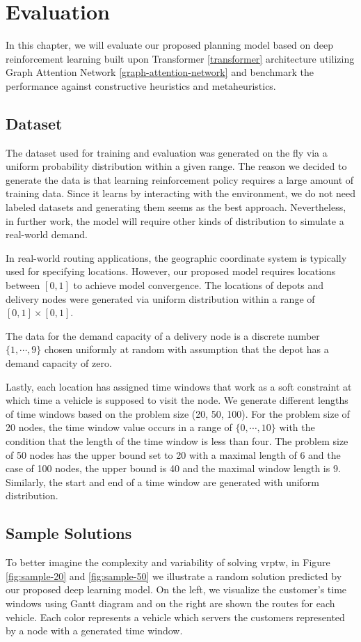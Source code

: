 \chapter{Evaluation}

In this chapter, we will evaluate our proposed planning model based on deep reinforcement learning built upon Transformer \ref{transformer} architecture utilizing Graph Attention Network \ref{graph-attention-network} and benchmark the performance against constructive heuristics and metaheuristics.

\section{Dataset}
The dataset used for training and evaluation was generated on the fly via a uniform probability distribution within a given range. The reason we decided to generate the data is that learning reinforcement policy requires a large amount of training data. Since it learns by interacting with the environment, we do not need labeled datasets and generating them seems as the best approach. Nevertheless, in further work, the model will require other kinds of distribution to simulate a real-world demand.

In real-world routing applications, the geographic coordinate system is typically used for specifying locations. However, our proposed model requires locations between $[0, 1]$ to achieve model convergence. The locations of depots and delivery nodes were generated via uniform distribution within a range of $[0, 1] \times [0, 1]$.

The data for the demand capacity of a delivery node is a discrete number $\{1, \cdots, 9\}$ chosen uniformly at random with assumption that the depot has a demand capacity of zero. 

Lastly, each location has assigned time windows that work as a soft constraint at which time a vehicle is supposed to visit the node. We generate different lengths of time windows based on the problem size (20, 50, 100). For the problem size of 20 nodes, the time window value occurs in a range of $\{0, \cdots, 10\}$ with the condition that the length of the time window is less than four. The problem size of 50 nodes has the upper bound set to 20 with a maximal length of 6 and the case of 100 nodes, the upper bound is 40 and the maximal window length is 9. Similarly, the start and end of a time window are generated with uniform distribution.

\section{Sample Solutions}
To better imagine the complexity and variability of solving \gls{vrptw}, in Figure \ref{fig:sample-20} and \ref{fig:sample-50} we illustrate a random solution predicted by our proposed deep learning model. On the left, we visualize the customer's time windows using Gantt diagram and on the right are shown the routes for each vehicle. Each color represents a vehicle which servers the customers represented by a node with a generated time window.

